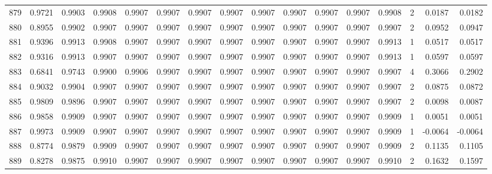 \begin{tabular}{lrrrrrrrrrrrrrrr}
879 &      0.9721 &  0.9903 &  0.9908 &  0.9907 &  0.9907 &  0.9907 &  0.9907 &  0.9907 &  0.9907 &  0.9907 &   0.9907 &     0.9908 &      2 &                    0.0187 &                     0.0182 \\
880 &      0.8955 &  0.9902 &  0.9907 &  0.9907 &  0.9907 &  0.9907 &  0.9907 &  0.9907 &  0.9907 &  0.9907 &   0.9907 &     0.9907 &      2 &                    0.0952 &                     0.0947 \\
881 &      0.9396 &  0.9913 &  0.9908 &  0.9907 &  0.9907 &  0.9907 &  0.9907 &  0.9907 &  0.9907 &  0.9907 &   0.9907 &     0.9913 &      1 &                    0.0517 &                     0.0517 \\
882 &      0.9316 &  0.9913 &  0.9907 &  0.9907 &  0.9907 &  0.9907 &  0.9907 &  0.9907 &  0.9907 &  0.9907 &   0.9907 &     0.9913 &      1 &                    0.0597 &                     0.0597 \\
883 &      0.6841 &  0.9743 &  0.9900 &  0.9906 &  0.9907 &  0.9907 &  0.9907 &  0.9907 &  0.9907 &  0.9907 &   0.9907 &     0.9907 &      4 &                    0.3066 &                     0.2902 \\
884 &      0.9032 &  0.9904 &  0.9907 &  0.9907 &  0.9907 &  0.9907 &  0.9907 &  0.9907 &  0.9907 &  0.9907 &   0.9907 &     0.9907 &      2 &                    0.0875 &                     0.0872 \\
885 &      0.9809 &  0.9896 &  0.9907 &  0.9907 &  0.9907 &  0.9907 &  0.9907 &  0.9907 &  0.9907 &  0.9907 &   0.9907 &     0.9907 &      2 &                    0.0098 &                     0.0087 \\
886 &      0.9858 &  0.9909 &  0.9907 &  0.9907 &  0.9907 &  0.9907 &  0.9907 &  0.9907 &  0.9907 &  0.9907 &   0.9907 &     0.9909 &      1 &                    0.0051 &                     0.0051 \\
887 &      0.9973 &  0.9909 &  0.9907 &  0.9907 &  0.9907 &  0.9907 &  0.9907 &  0.9907 &  0.9907 &  0.9907 &   0.9907 &     0.9909 &      1 &                   -0.0064 &                    -0.0064 \\
888 &      0.8774 &  0.9879 &  0.9909 &  0.9907 &  0.9907 &  0.9907 &  0.9907 &  0.9907 &  0.9907 &  0.9907 &   0.9907 &     0.9909 &      2 &                    0.1135 &                     0.1105 \\
889 &      0.8278 &  0.9875 &  0.9910 &  0.9907 &  0.9907 &  0.9907 &  0.9907 &  0.9907 &  0.9907 &  0.9907 &   0.9907 &     0.9910 &      2 &                    0.1632 &                     0.1597 \\

\end{tabular}
